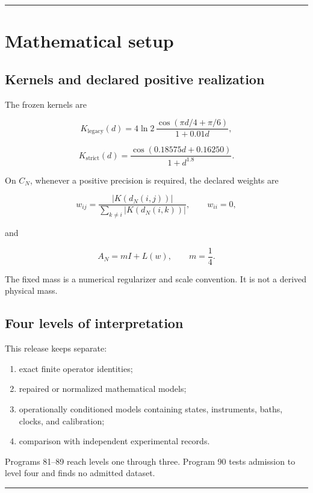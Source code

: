 \documentclass[11pt,a4paper,openany]{report}
\begin{document}
\par\medskip\hrule\medskip

\chapter{Mathematical setup}

\section{Kernels and declared positive realization}

The frozen kernels are

\[
K_{\mathrm{legacy}}(d)
=
4\ln2\,
\frac{\cos(\pi d/4+\pi/6)}{1+0.01d},
\]

\[
K_{\mathrm{strict}}(d)
=
\frac{\cos(0.18575d+0.16250)}
{1+d^{1.8}}.
\]

On \(C_N\), whenever a positive precision is required, the declared weights are

\[
w_{ij}
=
\frac{|K(d_N(i,j))|}
{\sum_{k\ne i}|K(d_N(i,k))|},
\qquad
w_{ii}=0,
\]

and

\[
A_N=mI+L(w),
\qquad
m=\frac14.
\]

The fixed mass is a numerical regularizer and scale convention. It is not a derived physical mass.

\section{Four levels of interpretation}

This release keeps separate:

\begin{enumerate}
\item 
exact finite operator identities;

\item 
repaired or normalized mathematical models;

\item 
operationally conditioned models containing states, instruments, baths, clocks, and calibration;

\item 
comparison with independent experimental records.

\end{enumerate}

Programs 81--89 reach levels one through three. Program 90 tests admission to level four and finds no admitted dataset.

\par\medskip\hrule\medskip
\end{document}
